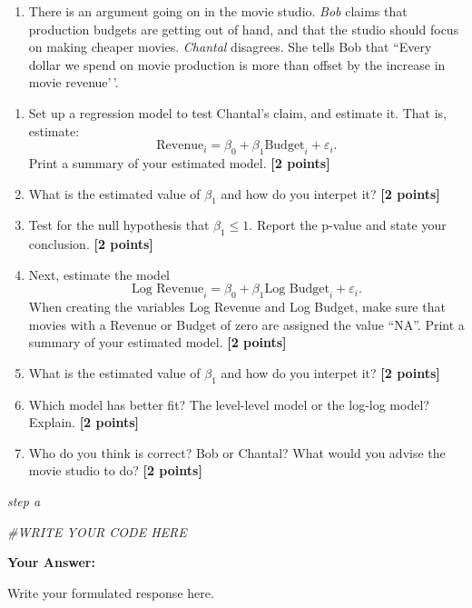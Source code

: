 \documentclass[
]{article}
\newenvironment{Shaded}{\begin{snugshade}}{\end{snugshade}}
\newcommand{\CommentTok}[1]{\textcolor[rgb]{0.56,0.35,0.01}{\textit{#1}}}
\providecommand{\tightlist}{%
  \setlength{\itemsep}{0pt}\setlength{\parskip}{0pt}}
\begin{document}
\begin{enumerate}
\def\labelenumi{\arabic{enumi}.}
\tightlist
\item
  There is an argument going on in the movie studio. \emph{Bob} claims
  that production budgets are getting out of hand, and that the studio
  should focus on making cheaper movies. \emph{Chantal} disagrees. She
  tells Bob that ``Every dollar we spend on movie production is more
  than offset by the increase in movie revenue'\,'.
\end{enumerate}

\begin{enumerate}
\def\labelenumi{\alph{enumi}.}
\tightlist
\item
  Set up a regression model to test Chantal's claim, and estimate it.
  That is, estimate:
  \[\text{Revenue}_i=\beta_0+\beta_1 \text{Budget}_i +\varepsilon_i.\]
  Print a summary of your estimated model. \textbf{[2 points]}
\item
  What is the estimated value of \(\beta_1\) and how do you interpet it?
  \textbf{[2 points]}
\item
  Test for the null hypothesis that \(\beta_1 \leq 1\). Report the
  p-value and state your conclusion. \textbf{[2 points]}
\item
  Next, estimate the model
  \[\text{Log Revenue}_i=\beta_0+\beta_1 \text{Log Budget}_i +\varepsilon_i.\]
  When creating the variables Log Revenue and Log Budget, make sure that
  movies with a Revenue or Budget of zero are assigned the value ``NA''.
  Print a summary of your estimated model. \textbf{[2 points]}
\item
  What is the estimated value of \(\beta_1\) and how do you interpet it?
  \textbf{[2 points]}
\item
  Which model has better fit? The level-level model or the log-log
  model? Explain. \textbf{[2 points]}
\item
  Who do you think is correct? Bob or Chantal? What would you advise the
  movie studio to do? \textbf{[2 points]}
\end{enumerate}

\emph{step a}

\begin{Shaded}
\begin{Highlighting}[]
\CommentTok{\#WRITE YOUR CODE HERE}
\end{Highlighting}
\end{Shaded}

\textbf{Your Answer:}

Write your formulated response here.
\end{document}
